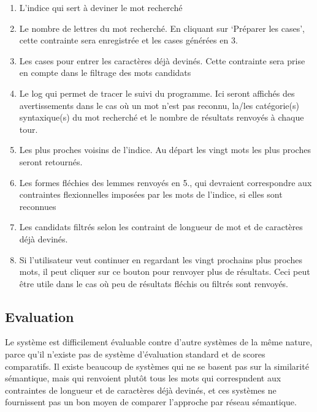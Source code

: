 \documentclass[a4paper, 12pt]{article}
\begin{document}
\begin{enumerate}
    \item{L'indice qui sert à deviner le mot recherché}
    \item{Le nombre de lettres du mot recherché. En cliquant sur \lq{Préparer les cases}\rq, cette contrainte sera enregistrée et les cases générées en 3.}
    \item{Les cases pour entrer les caractères déjà devinés. Cette contrainte sera prise en compte dans le filtrage des mots candidats}
    \item{Le log qui permet de tracer le suivi du programme. Ici seront affichés des avertissements dans le cas où un mot n'est pas reconnu, la/les catégorie(s) syntaxique(s) du mot recherché et le nombre de résultats renvoyés à chaque tour.}
    \item{Les plus proches voisins de l'indice. Au départ les vingt mots les plus proches seront retournés.}
    \item{Les formes fléchies des lemmes renvoyés en 5., qui devraient correspondre aux contraintes flexionnelles imposées par les mots de l'indice, si elles sont reconnues}
    \item{Les candidats filtrés selon les contraint de longueur de mot et de caractères déjà devinés.}
    \item{Si l'utilisateur veut continuer en regardant les vingt prochains plus proches mots, il peut cliquer sur ce bouton pour renvoyer plus de résultats. Ceci peut être utile dans le cas où peu de résultats fléchis ou filtrés sont renvoyés.}
    
\end{enumerate}


\subsection{Evaluation}
Le système est difficilement évaluable contre d'autre systèmes de la même nature, parce qu'il n'existe pas de système d'évaluation standard et de scores comparatifs. Il existe beaucoup de systèmes qui ne se basent pas sur la similarité sémantique, mais qui renvoient plutôt tous les mots qui correspndent aux contraintes de longueur et de caractères déjà devinés, et ces systèmes ne fournissent pas un bon moyen de comparer l'approche par réseau sémantique.
\end{document}
